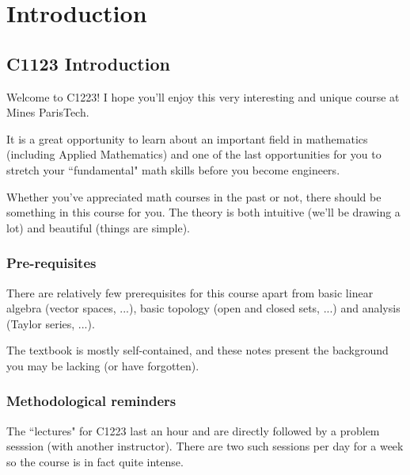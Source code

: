 \section*{Introduction}
\subsection*{C1123 Introduction}
Welcome to C1223! I hope you'll enjoy this very interesting and unique course at Mines ParisTech.

It is a great opportunity to learn about an important field in mathematics (including Applied Mathematics) and one of the last opportunities for you to stretch your ``fundamental" math skills before you become engineers.

Whether you've appreciated math courses in the past or not, there should be something in this course for you. The theory is both intuitive (we'll be drawing a lot) and beautiful (things are simple).

\subsubsection*{Pre-requisites}
There are relatively few prerequisites for this course apart from basic linear algebra (vector spaces, ...), basic topology (open and closed sets, ...) and analysis (Taylor series, ...).

The textbook is mostly self-contained, and these notes present the background you may be lacking (or have forgotten).

\subsubsection*{Methodological reminders}
The ``lectures" for C1223 last an hour and are directly followed by a problem sesssion (with another instructor). There are two such sessions per day for a week so the course is in fact quite intense.

